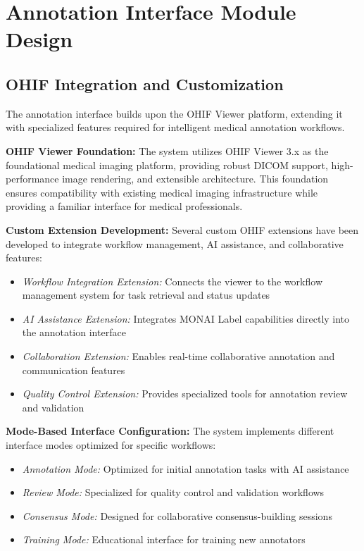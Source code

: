 \section{Annotation Interface Module Design}

\subsection{OHIF Integration and Customization}

The annotation interface builds upon the OHIF Viewer platform, extending it with specialized features required for intelligent medical annotation workflows.

\textbf{OHIF Viewer Foundation:} The system utilizes OHIF Viewer 3.x as the foundational medical imaging platform, providing robust DICOM support, high-performance image rendering, and extensible architecture. This foundation ensures compatibility with existing medical imaging infrastructure while providing a familiar interface for medical professionals.

\textbf{Custom Extension Development:} Several custom OHIF extensions have been developed to integrate workflow management, AI assistance, and collaborative features:

\begin{itemize}
    \item \textit{Workflow Integration Extension:} Connects the viewer to the workflow management system for task retrieval and status updates
    \item \textit{AI Assistance Extension:} Integrates MONAI Label capabilities directly into the annotation interface
    \item \textit{Collaboration Extension:} Enables real-time collaborative annotation and communication features
    \item \textit{Quality Control Extension:} Provides specialized tools for annotation review and validation
\end{itemize}

\textbf{Mode-Based Interface Configuration:} The system implements different interface modes optimized for specific workflows:

\begin{itemize}
    \item \textit{Annotation Mode:} Optimized for initial annotation tasks with AI assistance
    \item \textit{Review Mode:} Specialized for quality control and validation workflows
    \item \textit{Consensus Mode:} Designed for collaborative consensus-building sessions
    \item \textit{Training Mode:} Educational interface for training new annotators
\end{itemize}

